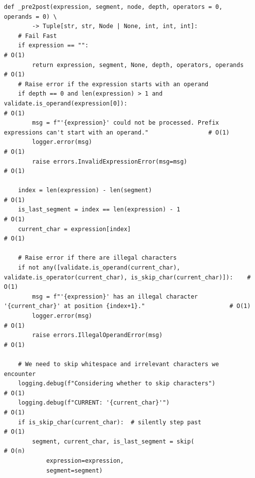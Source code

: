 \documentclass[10pt,letterpaper,final]{report}
\begin{document}
\begin{verbatim}
def _pre2post(expression, segment, node, depth, operators = 0, operands = 0) \
        -> Tuple[str, str, Node | None, int, int, int]:
    # Fail Fast
    if expression == "":                                                                                                # O(1)
        return expression, segment, None, depth, operators, operands                                                    # O(1)
    # Raise error if the expression starts with an operand
    if depth == 0 and len(expression) > 1 and validate.is_operand(expression[0]):                                       # O(1)
        msg = f"'{expression}' could not be processed. Prefix expressions can't start with an operand."                 # O(1)
        logger.error(msg)                                                                                               # O(1)
        raise errors.InvalidExpressionError(msg=msg)                                                                    # O(1)

    index = len(expression) - len(segment)                                                                              # O(1)
    is_last_segment = index == len(expression) - 1                                                                      # O(1)
    current_char = expression[index]                                                                                    # O(1)

    # Raise error if there are illegal characters
    if not any([validate.is_operand(current_char), validate.is_operator(current_char), is_skip_char(current_char)]):    # O(1)
        msg = f"'{expression}' has an illegal character '{current_char}' at position {index+1}."                        # O(1)
        logger.error(msg)                                                                                               # O(1)
        raise errors.IllegalOperandError(msg)                                                                           # O(1)

    # We need to skip whitespace and irrelevant characters we encounter
    logging.debug(f"Considering whether to skip characters")                                                            # O(1)
    logging.debug(f"CURRENT: '{current_char}'")                                                                         # O(1)
    if is_skip_char(current_char):  # silently step past                                                                # O(1)
        segment, current_char, is_last_segment = skip(                                                                  # O(n)
            expression=expression,
            segment=segment)


\end{verbatim}
\end{document}

